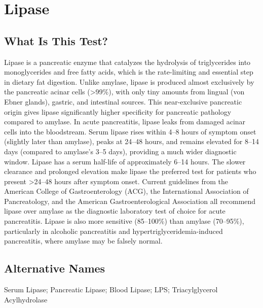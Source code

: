 \chapter{Lipase}

\section*{What Is This Test?}
Lipase is a pancreatic enzyme that catalyzes the hydrolysis of triglycerides into monoglycerides and free fatty acids, which is the rate-limiting and essential step in dietary fat digestion. Unlike amylase, lipase is produced almost exclusively by the pancreatic acinar cells (>99\%), with only tiny amounts from lingual (von Ebner glands), gastric, and intestinal sources. This near-exclusive pancreatic origin gives lipase significantly higher specificity for pancreatic pathology compared to amylase. In acute pancreatitis, lipase leaks from damaged acinar cells into the bloodstream. Serum lipase rises within 4--8 hours of symptom onset (slightly later than amylase), peaks at 24--48 hours, and remains elevated for 8--14 days (compared to amylase's 3--5 days), providing a much wider diagnostic window. Lipase has a serum half-life of approximately 6--14 hours. The slower clearance and prolonged elevation make lipase the preferred test for patients who present >24--48 hours after symptom onset. Current guidelines from the American College of Gastroenterology (ACG), the International Association of Pancreatology, and the American Gastroenterological Association all recommend lipase over amylase as the diagnostic laboratory test of choice for acute pancreatitis. Lipase is also more sensitive (85--100\%) than amylase (70--95\%), particularly in alcoholic pancreatitis and hypertriglyceridemia-induced pancreatitis, where amylase may be falsely normal.

\section*{Alternative Names}
Serum Lipase; Pancreatic Lipase; Blood Lipase; LPS; Triacylglycerol Acylhydrolase

